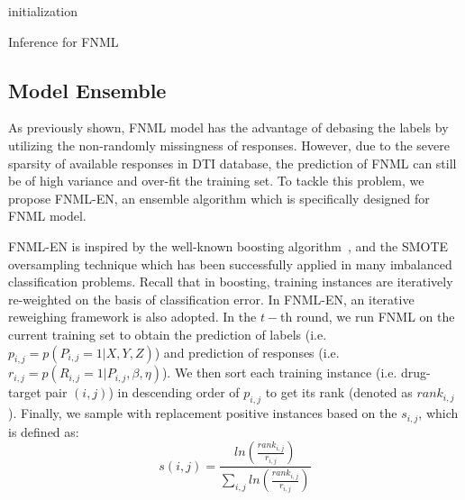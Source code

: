 \documentclass[journal]{IEEEtran}
\begin{document}
\begin{algorithm}
    \Output{$\mu$, $\upsilon$, $\rho$, $\theta$, $\zeta$}
    initialization\;
    \caption{Inference for FNML}\label{alg:model}
\end{algorithm}

\subsection{Model Ensemble}
As previously shown, FNML model has the advantage of debasing the labels by utilizing the non-randomly missingness of responses. However, due to the severe sparsity of available responses in DTI database, the prediction of FNML can still be of high variance and over-fit the training set. To tackle this problem, we propose FNML-EN, an ensemble algorithm which is specifically designed for FNML model.

FNML-EN is inspired by the well-known boosting algorithm~\cite{Boosting}, and the SMOTE~\cite{SMOTE} oversampling technique which has been successfully applied in many imbalanced classification problems. Recall that in boosting, training instances are iteratively re-weighted on the basis of classification error. In FNML-EN, an iterative reweighing framework is also adopted. In the $t-$th round, we run FNML on the current training set to obtain the prediction of labels (i.e. $p_{i,j}=p(P_{i,j}=1|X,Y,Z)$) and prediction of responses (i.e. $r_{i,j}=p(R_{i,j}=1|P_{i,j},\beta,\eta)$). We then sort each training instance (i.e. drug-target pair $(i,j)$) in descending order of $p_{i,j}$ to get its rank (denoted as $rank_{i,j}$). Finally, we sample with replacement positive instances based on the $s_{i,j}$, which is defined as:
\begin{equation}\label{equ:sample}
    s(i,j) = \frac{ln(\frac{rank_{i,j}}{r_{i,j}})}{\sum_{i,j}{ln(\frac{rank_{i,j}}{r_{i,j}})}}
\end{equation}
\end{document}
